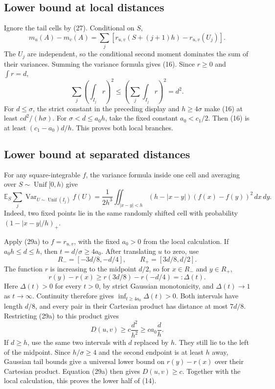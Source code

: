 \documentclass{article}
\theoremstyle{definition}
\theoremstyle{remark}
\newcommand{\E}{\mathbb E}
\newcommand{\1}{\mathbf 1}
\begin{document}
\subsection{Lower bound at local distances}

Ignore the tail cells by (27). Conditional on \(S\), \[ m_u(A)-m_v(A)= \sum_j\left[r_{u,v}(S+(j+1)h)-r_{u,v}(U_j)\right]. \tag{29} \] The \(U_j\) are independent, so the conditional second moment dominates the sum of their variances. Summing the variance formula gives (16). Since \(r\geq0\) and \(\int r=d\), \[ \sum_j\left(\int_{I_j}r\right)^2 \leq\left(\sum_j\int_{I_j}r\right)^2=d^2. \] For \(d\leq\sigma\), the strict constant in the preceding display and \(h\geq4\sigma\) make (16) at least \(c d^2/(h\sigma)\). For \(\sigma<d\leq a_0h\), take the fixed constant \(a_0<c_1/2\). Then (16) is at least \((c_1-a_0)d/h\). This proves both local branches.

\subsection{Lower bound at separated distances}

For any square-integrable \(f\), the variance formula inside one cell and averaging over \(S\sim\operatorname{Unif}[0,h)\) give \[ \E_S\sum_j\operatorname{Var}_{U\sim\operatorname{Unif}(I_j)}f(U) =\frac1{2h^3}\iint_{|x-y|<h}(h-|x-y|)(f(x)-f(y))^2\,dx\,dy. \tag{29a} \] Indeed, two fixed points lie in the same randomly shifted cell with probability \((1-|x-y|/h)_+\).

Apply (29a) to \(f=r_{u,v}\), with the fixed \(a_0>0\) from the local calculation. If \(a_0h\leq d\leq h\), then \(t=d/\sigma\geq4a_0\). After translating \(u\) to zero, use \[ R_-=[-3d/8,-d/4],\qquad R_+=[3d/8,d/2]. \] The function \(r\) is increasing to the midpoint \(d/2\), so for \(x\in R_-\) and \(y\in R_+\), \[ r(y)-r(x)\geq r(3d/8)-r(-d/4)=:\Delta(t). \] Here \(\Delta(t)>0\) for every \(t>0\), by strict Gaussian monotonicity, and \(\Delta(t)\to1\) as \(t\to\infty\). Continuity therefore gives \(\inf_{t\geq4a_0}\Delta(t)>0\). Both intervals have length \(d/8\), and every pair in their Cartesian product has distance at most \(7d/8\). Restricting (29a) to this product gives \[ D(u,v)\geq c\frac{d^2}{h^2}\geq ca_0\frac dh. \] If \(d\geq h\), use the same two intervals with \(d\) replaced by \(h\). They still lie to the left of the midpoint. Since \(h/\sigma\geq4\) and the second endpoint is at least \(h\) away, Gaussian tail bounds give a universal lower bound on \(r(y)-r(x)\) over their Cartesian product. Equation (29a) then gives \(D(u,v)\geq c\). Together with the local calculation, this proves the lower half of (14).
\end{document}
